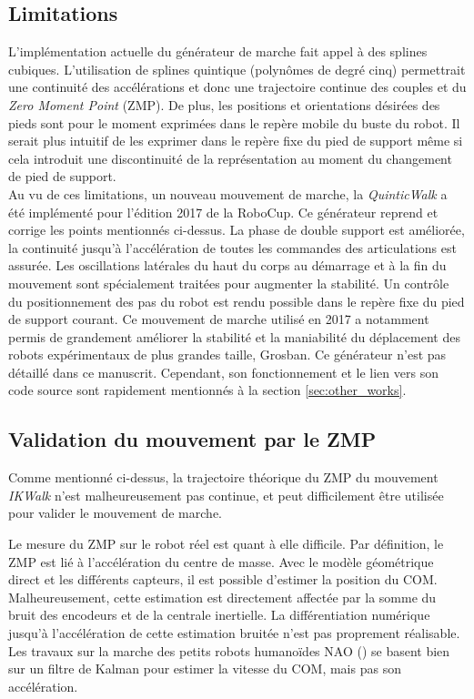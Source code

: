 \subsection{Limitations\label{sec:walk_limitations}}

L'implémentation actuelle du générateur de marche fait appel à des splines cubiques.
L'utilisation de splines quintique (polynômes de degré cinq) permettrait une continuité
des accélérations et donc une trajectoire continue des couples 
et du \textit{Zero Moment Point} (ZMP).
De plus, les positions et orientations désirées des pieds sont
pour le moment exprimées dans le repère mobile du buste du robot. 
Il serait plus intuitif de les exprimer dans le repère fixe du pied de support 
même si cela introduit une discontinuité de la représentation au moment 
du changement de pied de support.\\

Au vu de ces limitations, un nouveau mouvement de marche, la \textit{QuinticWalk}
a été implémenté pour l'édition 2017 de la RoboCup.
Ce générateur reprend et corrige les points mentionnés ci-dessus.
La phase de double support est améliorée, la continuité jusqu'à
l'accélération de toutes les commandes des articulations est assurée.
Les oscillations latérales du haut du corps au démarrage et à la fin 
du mouvement sont spécialement traitées pour augmenter la stabilité.
Un contrôle du positionnement des pas du robot est rendu possible 
dans le repère fixe du pied de support courant.
Ce mouvement de marche utilisé en 2017 a notamment permis de grandement améliorer
la stabilité et la maniabilité du déplacement des robots expérimentaux 
de plus grandes taille, Grosban.
Ce générateur n'est pas détaillé dans ce manuscrit.
Cependant, son fonctionnement et le lien vers son code source sont rapidement
mentionnés à la section \ref{sec:other_works}.

\subsection{Validation du mouvement par le ZMP}

Comme mentionné ci-dessus, la trajectoire théorique du ZMP 
du mouvement \textit{IKWalk} n'est malheureusement pas continue,
et peut difficilement être utilisée pour valider le mouvement de marche.

Le mesure du ZMP sur le robot réel est quant à elle difficile.
Par définition, le ZMP est lié à l'accélération du centre de masse.
Avec le modèle géométrique direct et les différents capteurs, il est 
possible d'estimer la position du COM. 
Malheureusement, cette estimation est directement affectée par
la somme du bruit des encodeurs et de la centrale inertielle.
La différentiation numérique jusqu'à l'accélération de cette 
estimation bruitée n'est pas proprement réalisable.
Les travaux sur la marche des petits robots humanoïdes NAO (\cite{graf_center_2011})
se basent bien sur un filtre de Kalman pour estimer la vitesse du COM, 
mais pas son accélération.

